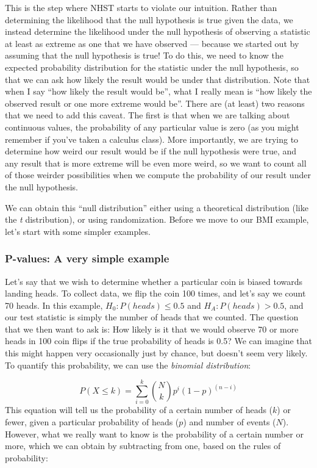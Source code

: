 \documentclass[
  12pt,
]{book}
\begin{document}
This is the step where NHST starts to violate our intuition. Rather than determining the likelihood that the null hypothesis is true given the data, we instead determine the likelihood under the null hypothesis of observing a statistic at least as extreme as one that we have observed --- because we started out by assuming that the null hypothesis is true! To do this, we need to know the expected probability distribution for the statistic under the null hypothesis, so that we can ask how likely the result would be under that distribution. Note that when I say ``how likely the result would be'', what I really mean is ``how likely the observed result or one more extreme would be''. There are (at least) two reasons that we need to add this caveat. The first is that when we are talking about continuous values, the probability of any particular value is zero (as you might remember if you've taken a calculus class). More importantly, we are trying to determine how weird our result would be if the null hypothesis were true, and any result that is more extreme will be even more weird, so we want to count all of those weirder possibilities when we compute the probability of our result under the null hypothesis.

We can obtain this ``null distribution'' either using a theoretical distribution (like the \emph{t} distribution), or using randomization. Before we move to our BMI example, let's start with some simpler examples.

\hypertarget{pvalues-very-simple}{%
\subsubsection{P-values: A very simple example}\label{pvalues-very-simple}}

Let's say that we wish to determine whether a particular coin is biased towards landing heads. To collect data, we flip the coin 100 times, and let's say we count 70 heads. In this example, \(H_0: P(heads) \le 0.5\) and \(H_A: P(heads) > 0.5\), and our test statistic is simply the number of heads that we counted. The question that we then want to ask is: How likely is it that we would observe 70 or more heads in 100 coin flips if the true probability of heads is 0.5? We can imagine that this might happen very occasionally just by chance, but doesn't seem very likely. To quantify this probability, we can use the \emph{binomial distribution}:

\[
P(X \le k) = \sum_{i=0}^k \binom{N}{k} p^i (1-p)^{(n-i)}
\]
This equation will tell us the probability of a certain number of heads (\(k\)) or fewer, given a particular probability of heads (\(p\)) and number of events (\(N\)). However, what we really want to know is the probability of a certain number or more, which we can obtain by subtracting from one, based on the rules of probability:
\end{document}
